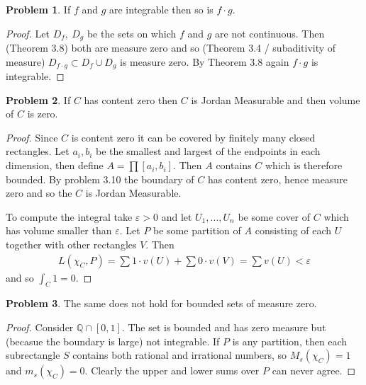 \documentclass[20pt]{article}
\theoremstyle{plain}
\theoremstyle{definition}
\newtheorem*{problem}{Problem}
\newcommand{\rationals}{\mathbb{Q}}
\begin{document}
\begin{problem}{3.14}
  If $f$ and $g$ are integrable then so is $f\cdot g$.
\end{problem}

\begin{proof}
  Let $D_f,\ D_g$ be the sets on which $f$ and $g$ are not continuous.
  Then (Theorem 3.8) both are measure zero and so (Theorem 3.4 / subaditivity of measure)
  $D_{f\cdot g} \subset D_f \cup D_g$ is measure zero.
  By Theorem 3.8 again $f \cdot g$ is integrable.
\end{proof}


\begin{problem}{3.15}
  If $C$ has content zero then $C$ is Jordan Measurable and 
  then volume of $C$ is zero.
\end{problem}

\begin{proof}
  Since $C$ is content zero it can be covered by finitely many closed rectangles.
  Let $a_i, b_i$ be the smallest and largest of the endpoints in each dimension,
  then define $A = \prod [a_i, b_i].$ Then $A$ contains $C$ which is therefore bounded.
  By problem 3.10 the boundary of $C$ has content zero, hence measure zero and so
  the $C$ is Jordan Measurable.

  To compute the integral take $\varepsilon > 0$ and let 
  $U_1, ..., U_n$ be some cover of $C$ which has volume smaller than $\varepsilon.$
  Let $P$ be some partition of $A$ consisting 
  of each $U$ together with other rectangles $V$.
  Then 
  \begin{align*}
    L(\chi_C, P) = \sum 1 \cdot v(U) + \sum 0 \cdot v(V) = \sum v(U) < \varepsilon
  \end{align*}
  and so $\int_C 1 = 0.$

\end{proof}

\begin{problem}{3.16}
  The same does not hold for bounded sets of measure zero.
\end{problem}

\begin{proof}
  Consider $\rationals \cap [0,1].$  The set is bounded and has zero measure but 
  (becasue the boundary is large) not integrable. 
  If $P$ is any partition, then each subrectangle $S$ contains both rational and
  irrational numbers, so $M_s(\chi_C) = 1$ and $m_s(\chi_C) = 0.$  Clearly the upper and lower 
  sums over $P$ can never agree.
\end{proof}
\end{document}
